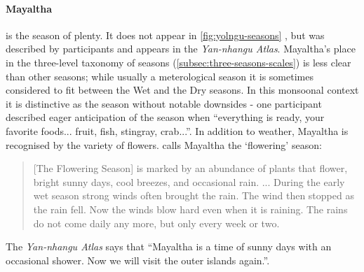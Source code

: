 \paragraph{Mayaltha} is the season of plenty.  It does not appear in
\cref{fig:yolngu-seasons} \citep{davis1989}, but was described by
participants and appears in the \textit{Yan-nhangu Atlas}.  Mayaltha's
place in the three-level taxonomy of seasons (\cref{subsec:three-seasons-scales})
is less clear than other seasons; while usually a meterological season
it is sometimes considered to fit between the Wet and the Dry seasons.
%
In this monsoonal context it is distinctive as the season without notable
downsides - one participant described eager anticipation of the season
when ``everything is ready, your favorite foods...  fruit, fish, stingray,
crab...''.  In addition to weather, Mayaltha is recognised by the variety
of flowers.
%
\citet{davis1989} calls Mayaltha the `flowering' season:
\begin{quote}
    [The Flowering Season] is marked by an abundance of plants that
    flower, bright sunny days, cool breezes, and occasional rain. ...
    During the early wet season strong winds often brought the rain.
    The wind then stopped as the rain fell.  Now the winds blow hard
    even when it is raining.  The rains do not come daily any more,
    but only every week or two.
\end{quote}

The \textit{Yan-nhangu Atlas} says that ``Mayaltha is a time of sunny days
with an occasional shower.  Now we will visit the outer islands again.''.



